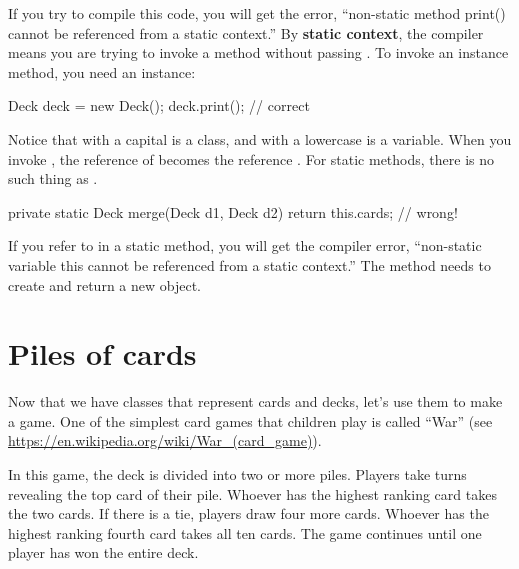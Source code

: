 
If you try to compile this code, you will get the error, ``non-static method print() cannot be referenced from a static context.''
By {\bf static context}, the compiler means you are trying to invoke a method without passing .
To invoke an instance method, you need an instance:

\begin{code}
Deck deck = new Deck();
deck.print();  // correct
\end{code}

Notice that  with a capital  is a class, and  with a lowercase  is a variable.
When you invoke , the reference of  becomes the reference .
For static methods, there is no such thing as .

\begin{code}
private static Deck merge(Deck d1, Deck d2) {
    return this.cards;  // wrong!
}
\end{code}

If you refer to  in a static method, you will get the compiler error, ``non-static variable this cannot be referenced from a static context.''
The  method needs to create and return a new  object.


%


\section{Piles of cards}

Now that we have classes that represent cards and decks, let's use them to make a game.
One of the simplest card games that children play is called ``War'' (see \url{https://en.wikipedia.org/wiki/War_(card_game)}).

In this game, the deck is divided into two or more piles.
Players take turns revealing the top card of their pile.
Whoever has the highest ranking card takes the two cards.
If there is a tie, players draw four more cards.
Whoever has the highest ranking fourth card takes all ten cards.
The game continues until one player has won the entire deck.

